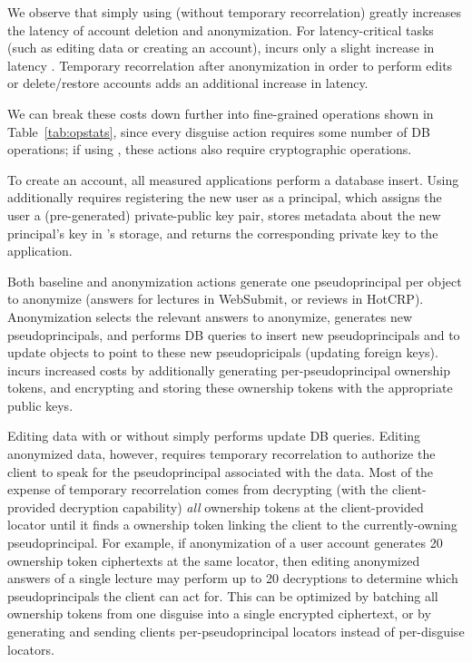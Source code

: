 We observe that simply using \sys (without temporary recorrelation) greatly increases the latency of
account deletion and anonymization.  For latency-critical tasks (such as editing data or creating an
account), \sys incurs only a slight increase in latency . Temporary recorrelation
after anonymization in order to perform edits or delete/restore accounts adds an additional
 increase in latency.

We can break these costs down further into fine-grained operations shown in 
Table~\ref{tab:opstats}, since every disguise action requires some number of DB operations; if using
\sys, these actions also require cryptographic operations.

To create an account, all measured applications perform a database insert. Using \sys additionally
requires registering the new user as a principal, which assigns the user a (pre-generated)
private-public key pair, stores metadata about the new principal's key in \sys's storage, and
returns the corresponding private key to the application.

Both baseline and \sys anonymization actions generate one pseudoprincipal per object to anonymize
(\eg answers for lectures in WebSubmit, or reviews in HotCRP). Anonymization selects the relevant answers
to anonymize, generates new pseudoprincipals, and performs DB queries to insert new pseudoprincipals
and to update objects to point to these new pseudopricipals (\eg updating foreign keys).
\sys incurs increased costs by additionally generating per-pseudoprincipal ownership tokens, and 
encrypting and storing these ownership tokens with the appropriate public keys.

Editing data with or without \sys simply performs update DB queries. Editing anonymized data,
however, requires temporary recorrelation to authorize the client to speak for the pseudoprincipal
associated with the data.  Most of the expense of temporary recorrelation comes from \sys decrypting
(with the client-provided decryption capability) \emph{all} ownership tokens at the client-provided
locator until it finds a ownership token linking the client to the currently-owning pseudoprincipal.
For example, if anonymization of a user account generates 20 ownership token ciphertexts at the same
locator, then editing anonymized answers of a single lecture may perform up to 20 decryptions to
determine which pseudoprincipals the client can act for. This can be optimized by batching all
ownership tokens from one disguise into a single encrypted ciphertext, or by generating and sending
clients per-pseudoprincipal locators instead of per-disguise locators.

